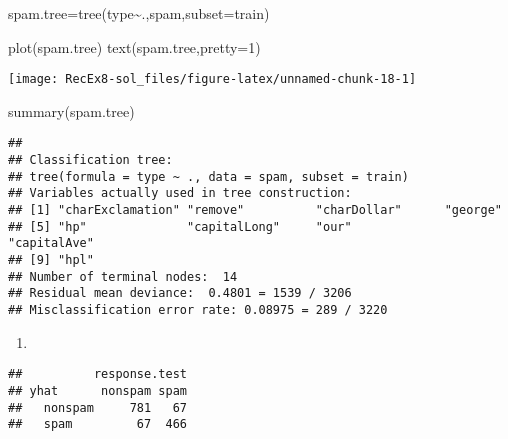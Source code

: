 \documentclass[
]{article}
\newenvironment{Shaded}{\begin{snugshade}}{\end{snugshade}}
\newcommand{\AttributeTok}[1]{\textcolor[rgb]{0.77,0.63,0.00}{#1}}
\newcommand{\DecValTok}[1]{\textcolor[rgb]{0.00,0.00,0.81}{#1}}
\newcommand{\FunctionTok}[1]{\textcolor[rgb]{0.00,0.00,0.00}{#1}}
\newcommand{\NormalTok}[1]{#1}
\newcommand{\OtherTok}[1]{\textcolor[rgb]{0.56,0.35,0.01}{#1}}
\newcommand{\SpecialCharTok}[1]{\textcolor[rgb]{0.00,0.00,0.00}{#1}}
\newcommand{\StringTok}[1]{\textcolor[rgb]{0.31,0.60,0.02}{#1}}
\providecommand{\tightlist}{%
  \setlength{\itemsep}{0pt}\setlength{\parskip}{0pt}}
\begin{document}
\begin{Shaded}
\begin{Highlighting}[]
\NormalTok{spam.tree}\OtherTok{=}\FunctionTok{tree}\NormalTok{(type}\SpecialCharTok{\textasciitilde{}}\NormalTok{.,spam,}\AttributeTok{subset=}\NormalTok{train)}

\FunctionTok{plot}\NormalTok{(spam.tree)}
\FunctionTok{text}\NormalTok{(spam.tree,}\AttributeTok{pretty=}\DecValTok{1}\NormalTok{)}
\end{Highlighting}
\end{Shaded}

\texttt{[image: RecEx8-sol\_files/figure-latex/unnamed-chunk-18-1]}

\begin{Shaded}
\begin{Highlighting}[]
\FunctionTok{summary}\NormalTok{(spam.tree)}
\end{Highlighting}
\end{Shaded}

\begin{verbatim}
## 
## Classification tree:
## tree(formula = type ~ ., data = spam, subset = train)
## Variables actually used in tree construction:
## [1] "charExclamation" "remove"          "charDollar"      "george"         
## [5] "hp"              "capitalLong"     "our"             "capitalAve"     
## [9] "hpl"            
## Number of terminal nodes:  14 
## Residual mean deviance:  0.4801 = 1539 / 3206 
## Misclassification error rate: 0.08975 = 289 / 3220
\end{verbatim}

\begin{enumerate}
\def\labelenumi{\alph{enumi})}
\setcounter{enumi}{3}
\tightlist
\item
\end{enumerate}

\begin{Shaded}
\end{Shaded}

\begin{verbatim}
##          response.test
## yhat      nonspam spam
##   nonspam     781   67
##   spam         67  466
\end{verbatim}
\end{document}
